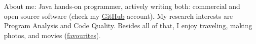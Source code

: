 \documentclass[10pt,a4paper,normalphoto]{altacv}
\begin{document}
  \makecvheader
  About me: Java hands-on programmer, actively writing both: commercial and open source software
  (check my \href{https://github.com/h1alexbel}{GitHub} account).
  My research interests are Program Analysis and Code Quality.
  Besides all of that, I enjoy traveling, making photos, and movies (\href{https://www.h1alexbel.xyz/good-movies.html}{favourites}).
\end{document}
